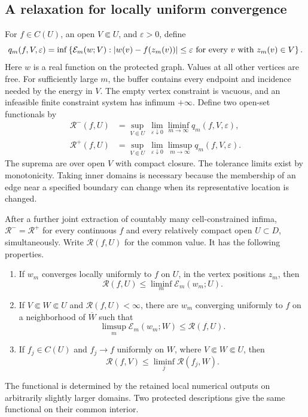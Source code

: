 \subsection{A relaxation for locally uniform convergence}

For \(f\in C(U)\), an open \(V\Subset U\), and \(\varepsilon>0\), define
\begin{equation}\label{eq:constrained-energy}
 q_m(f,V,\varepsilon)
  =\inf\left\{\mathcal E_m(w;V):
       \lvert w(v)-f(z_m(v))\rvert\le\varepsilon
       \text{ for every }v\text{ with }z_m(v)\in V\right\}.
\end{equation}
Here \(w\) is a real function on the protected graph.  Values at all other
vertices are free.  For sufficiently large \(m\), the buffer contains
every endpoint and incidence needed by the energy in \(V\).  The empty
vertex constraint is vacuous, and an infeasible finite constraint system
has infimum \(+\infty\).  Define two open-set functionals by
\begin{equation}\label{eq:uniform-relaxations}
 \begin{split}
 \mathcal R^-(f,U)
   &=\sup_{V\Subset U}\ \lim_{\varepsilon\downarrow0}
                     \liminf_{m\to\infty}q_m(f,V,\varepsilon),\\
 \mathcal R^+(f,U)
   &=\sup_{V\Subset U}\ \lim_{\varepsilon\downarrow0}
                     \limsup_{m\to\infty}q_m(f,V,\varepsilon).
 \end{split}
\end{equation}
The suprema are over open \(V\) with compact closure.  The tolerance limits
exist by monotonicity.  Taking inner domains is necessary because the
membership of an edge near a specified boundary can change when its
representative location is changed.

\begin{lemma}\label{lem:uniform-relaxation}
After a further joint extraction of countably many cell-constrained
infima, \(\mathcal R^-=\mathcal R^+\) for every continuous \(f\) and every
relatively compact open \(U\subset D\), simultaneously.  Write
\(\mathcal R(f,U)\) for the common value.  It has the following properties.
\begin{enumerate}[label=\textup{(\roman*)}]
\item If \(w_m\) converges locally uniformly to \(f\) on \(U\), in the
vertex positions \(z_m\), then
\[
 \mathcal R(f,U)\le\liminf_m\mathcal E_m(w_m;U).
\]
\item If \(V\Subset W\Subset U\) and \(\mathcal R(f,U)<\infty\), there
are \(w_m\) converging uniformly to \(f\) on a neighborhood of
\(\overline W\) such that
\[
 \limsup_m\mathcal E_m(w_m;W)\le\mathcal R(f,U).
\]
\item If \(f_j\in C(U)\) and \(f_j\to f\) uniformly on \(W\), where
\(V\Subset W\Subset U\),
then
\[
 \mathcal R(f,V)\le\liminf_j\mathcal R(f_j,W).
\]
\end{enumerate}
The functional is determined by the retained local numerical outputs on
arbitrarily slightly larger domains.  Two protected descriptions give the
same functional on their common interior.
\end{lemma}

